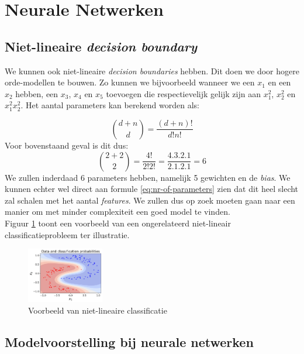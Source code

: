\section{Neurale Netwerken}

\subsection{Niet-lineaire \textit{decision boundary}}

We kunnen ook niet-lineaire \textit{decision boundaries} hebben. Dit doen we door hogere orde-modellen te bouwen. Zo kunnen we bijvoorbeeld wanneer we een $x_{1}$ en een $x_{2}$ hebben, een $x_{3}$, $x_{4}$ en $x_{5}$ toevoegen die respectievelijk gelijk zijn aan $x_{1}^{2}$, $x_{2}^{2}$ en $x_{1}^{2} x_{2}^{2}$. Het aantal parameters kan berekend worden als:

\begin{equation}
	{d + n \choose d} = \frac{(d+n)!}{d! n!}
	\label{eq:nr-of-parameters}
\end{equation}
\noindent
Voor bovenstaand geval is dit dus: 
\begin{equation*}
	{2 + 2 \choose 2} = \frac{4!}{2! 2!} = \frac{4.3.2.1}{2.1.2.1} = 6
\end{equation*}
\noindent
We zullen inderdaad 6 parameters hebben, namelijk 5 gewichten en de \textit{bias}. We kunnen echter wel direct aan formule \ref{eq:nr-of-parameters} zien dat dit heel slecht zal schalen met het aantal \textit{features}. We zullen dus op zoek moeten gaan naar een manier om met minder complexiteit een goed model te vinden. \\
\newpage
Figuur \ref{fig:non-linear-classification} toont een voorbeeld van een ongerelateerd niet-lineair classificatieprobleem ter illustratie.
\begin{figure}[h]
	\centering
	\includegraphics[width=0.3\textwidth]{images/12-non-linear-classification.png}
	\caption{Voorbeeld van niet-lineaire classificatie}
	\label{fig:non-linear-classification}
\end{figure}

\subsection{Modelvoorstelling bij neurale netwerken}

